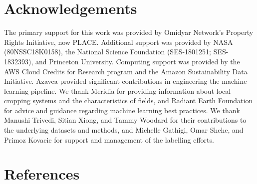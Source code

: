 \documentclass[11pt,a4paper]{article}
\begin{document}
\hypertarget{acknowledgements}{%
\section{Acknowledgements}\label{acknowledgements}}

The primary support for this work was provided by Omidyar Network's
Property Rights Initiative, now PLACE. Additional support was provided
by NASA (80NSSC18K0158), the National Science Foundation (SES-1801251;
SES-1832393), and Princeton University. Computing support was provided
by the AWS Cloud Credits for Research program and the Amazon
Sustainability Data Initiative. Azavea provided significant
contributions in engineering the machine learning pipeline. We thank
Meridia for providing information about local cropping systems and the
characteristics of fields, and Radiant Earth Foundation for advice and
guidance regarding machine learning best practices. We thank Manushi
Trivedi, Sitian Xiong, and Tammy Woodard for their contributions to the
underlying datasets and methods, and Michelle Gathigi, Omar Shehe, and
Primoz Kovacic for support and management of the labelling efforts.

\hypertarget{references}{%
\section{References}\label{references}}

\singlespace
\end{document}
